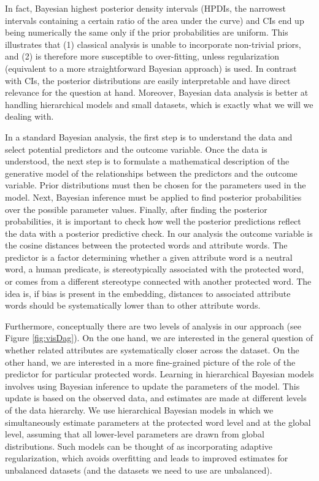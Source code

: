 \documentclass[
  12pt,
  dvipsnames,enabledeprecatedfontcommands]{scrartcl}
\begin{document}
In fact, Bayesian highest posterior density intervals (HPDIs, the
narrowest intervals containing a certain ratio of the area under the
curve) and CIs end up being numerically the same only if the prior
probabilities are uniform. This illustrates that (1) classical analysis
is unable to incorporate non-trivial priors, and (2) is therefore more
susceptible to over-fitting, unless regularization (equivalent to a more
straightforward Bayesian approach) is used. In contrast with CIs, the
posterior distributions are easily interpretable and have direct
relevance for the question at hand. Moreover, Bayesian data analysis is
better at handling hierarchical models and small datasets, which is
exactly what we will we dealing with.

In a standard Bayesian analysis, the first step is to understand the
data and select potential predictors and the outcome variable. Once the
data is understood, the next step is to formulate a mathematical
description of the generative model of the relationships between the
predictors and the outcome variable. Prior distributions must then be
chosen for the parameters used in the model. Next, Bayesian inference
must be applied to find posterior probabilities over the possible
parameter values. Finally, after finding the posterior probabilities, it
is important to check how well the posterior predictions reflect the
data with a posterior predictive check. In our analysis the outcome
variable is the cosine distances between the protected words and
attribute words. The predictor is a factor determining whether a given
attribute word is a neutral word, a human predicate, is stereotypically
associated with the protected word, or comes from a different stereotype
connected with another protected word. The idea is, if bias is present
in the embedding, distances to associated attribute words should be
systematically lower than to other attribute words.

Furthermore, conceptually there are two levels of analysis in our
approach (see Figure \ref{fig:visDag}). On the one hand, we are
interested in the general question of whether related attributes are
systematically closer across the dataset. On the other hand, we are
interested in a more fine-grained picture of the role of the predictor
for particular protected words. Learning in hierarchical Bayesian models
involves using Bayesian inference to update the parameters of the model.
This update is based on the observed data, and estimates are made at
different levels of the data hierarchy. We use hierarchical Bayesian
models in which we simultaneously estimate parameters at the protected
word level and at the global level, assuming that all lower-level
parameters are drawn from global distributions. Such models can be
thought of as incorporating adaptive regularization, which avoids
overfitting and leads to improved estimates for unbalanced datasets (and
the datasets we need to use are unbalanced).
\end{document}
